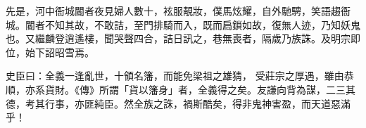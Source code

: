 \begin{pinyinscope}
 先是，河中衙城閽者夜見婦人數十，袨服靚妝，僕馬炫耀，自外馳騁，笑語趨衙城。閽者不知其故，不敢詰，至門排騎而入，既而扃鎖如故，復無人迹，乃知妖鬼也。又繼麟登逍遙樓，聞哭聲四合，詰日訊之，巷無喪者，隔歲乃族誅。及明宗即位，始下詔昭雪焉。



 史臣曰：全義一逢亂世，十領名籓，而能免梁祖之雄猜，
 受莊宗之厚遇，雖由恭順，亦系貨財。《傳》所謂「貨以籓身」者，全義得之矣。友謙向背為謀，二三其德，考其行事，亦匪純臣。然全族之誅，禍斯酷矣，得非鬼神害盈，而天道惡滿乎！



\end{pinyinscope}